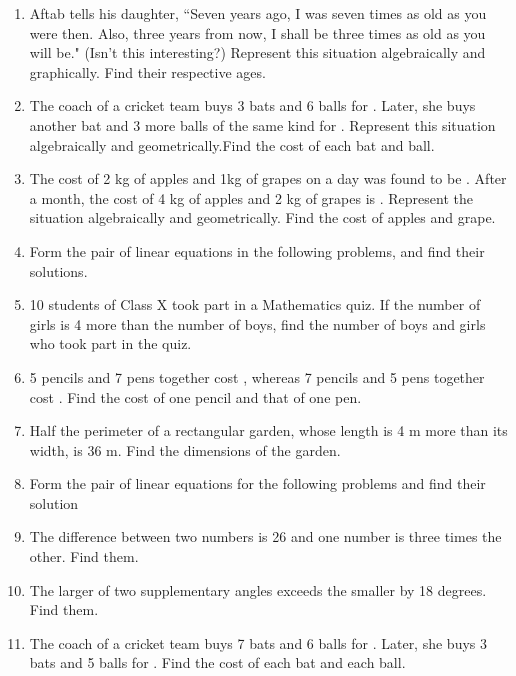 \begin{enumerate}[label=\arabic*.,ref=\thesubsection.\theenumi]
\item Aftab tells his daughter, ``Seven years ago, I was seven times as old as you were then. Also, three years from now, I shall be three times as old as you will be." (Isn’t this interesting?) Represent this situation algebraically and graphically. Find their respective ages.
\item  The coach of a cricket team buys 3 bats and 6 balls for . Later, she buys another bat and 3 more balls of the same kind for . Represent this situation algebraically and geometrically.Find the cost of each bat and ball.
\item  The cost of 2 kg of apples and 1kg of grapes on a day was found to be . After a month, the cost of 4 kg of apples and 2 kg of grapes is . Represent the situation algebraically and geometrically.  Find the cost of apples and grape.
\item Form the pair of linear equations in the following problems, and find their solutions. 
%
\item  10 students of Class X took part in a Mathematics quiz. If the number of girls is 4 more than the number of boys, find the number of boys and girls who took part in the quiz.
\item  5 pencils and 7 pens together cost , whereas 7 pencils and 5 pens together cost . Find the cost of one pencil and that of one pen.
%
\item Half the perimeter of a rectangular garden, whose length is 4 m more than its width, is 36 m. Find the dimensions of the garden.
%
\item Form the pair of linear equations for the following problems and find their solution 
\item  The difference between two numbers is 26 and one number is three times the other. Find them.
\item The larger of two supplementary angles exceeds the smaller by 18 degrees. Find them.
\item The coach of a cricket team buys 7 bats and 6 balls for . Later, she buys 3 bats and 5 balls for . Find the cost of each bat and each ball.


\end{enumerate}

